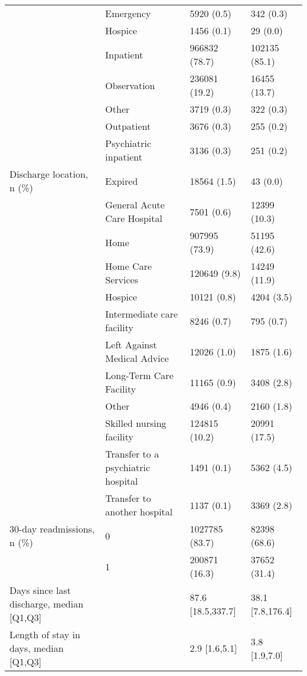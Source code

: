 \begin{tabular}{llll}
                                       & Emergency &              5920 (0.5) &         342 (0.3) \\
                                       & Hospice &              1456 (0.1) &          29 (0.0) \\
                                       & Inpatient &           966832 (78.7) &     102135 (85.1) \\
                                       & Observation &           236081 (19.2) &      16455 (13.7) \\
                                       & Other &              3719 (0.3) &         322 (0.3) \\
                                       & Outpatient &              3676 (0.3) &         255 (0.2) \\
                                       & Psychiatric inpatient &              3136 (0.3) &         251 (0.2) \\
Discharge location, n (\%) & Expired &             18564 (1.5) &          43 (0.0) \\
                                       & General Acute Care Hospital &              7501 (0.6) &      12399 (10.3) \\
                                       & Home &           907995 (73.9) &      51195 (42.6) \\
                                       & Home Care Services &            120649 (9.8) &      14249 (11.9) \\
                                       & Hospice &             10121 (0.8) &        4204 (3.5) \\
                                       & Intermediate care facility &              8246 (0.7) &         795 (0.7) \\
                                       & Left Against Medical Advice &             12026 (1.0) &        1875 (1.6) \\
                                       & Long-Term Care Facility &             11165 (0.9) &        3408 (2.8) \\
                                       & Other &              4946 (0.4) &        2160 (1.8) \\
                                       & Skilled nursing facility &           124815 (10.2) &      20991 (17.5) \\
                                       & Transfer to a psychiatric hospital &              1491 (0.1) &        5362 (4.5) \\
                                       & Transfer to another hospital &              1137 (0.1) &        3369 (2.8) \\
30-day readmissions, n (\%) & 0 &          1027785 (83.7) &      82398 (68.6) \\
                                       & 1 &           200871 (16.3) &      37652 (31.4) \\
Days since last discharge, median [Q1,Q3] &   &       87.6 [18.5,337.7] &  38.1 [7.8,176.4] \\
Length of stay in days, median [Q1,Q3] &   &           2.9 [1.6,5.1] &     3.8 [1.9,7.0] \\
\bottomrule
\end{tabular}
